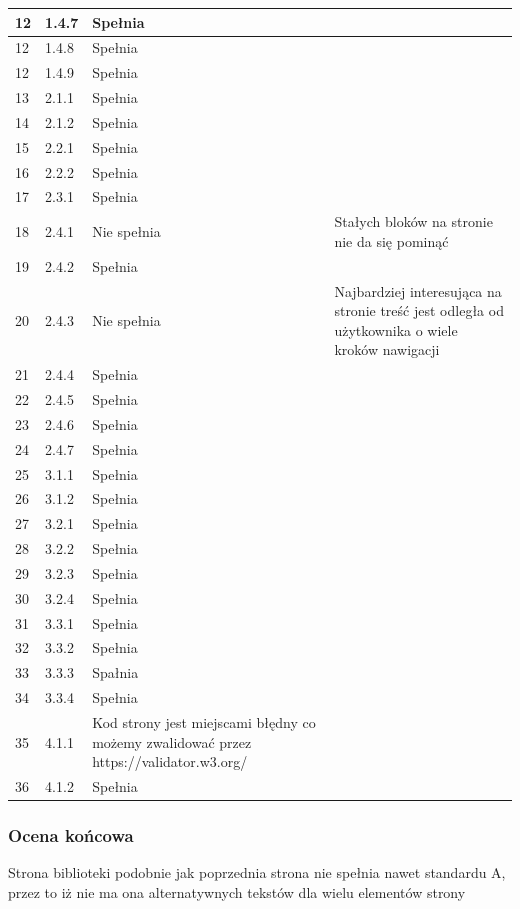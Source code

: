\documentclass[12pt]{article}
\begin{document}
\begin{longtable}{|p{}|p{}|p{}|p{}|}
        \hline
        12 & 1.4.7 &  Spełnia & \\
        \hline
        12 & 1.4.8 &  Spełnia & \\
        \hline
        12 & 1.4.9 &  Spełnia & \\
        \hline
        13 & 2.1.1 &  Spełnia & \\
        \hline
        14 & 2.1.2 & Spełnia & \\
        \hline
        15 & 2.2.1 &  Spełnia & \\
        \hline
        16 & 2.2.2 &  Spełnia & \\
        \hline
        17 & 2.3.1 &  Spełnia & \\
        \hline
        18 & 2.4.1 & Nie spełnia & Stałych bloków na stronie nie da się pominąć\\
        \hline
        19 & 2.4.2 &  Spełnia & \\
        \hline
        20 & 2.4.3 &  Nie spełnia & Najbardziej interesująca na stronie treść jest odległa od użytkownika o wiele kroków nawigacji\\
        \hline
        21 & 2.4.4 &  Spełnia & \\
        \hline
        22 & 2.4.5 &  Spełnia & \\
        \hline
        23 & 2.4.6 &  Spełnia & \\
        \hline
        24 & 2.4.7 &  Spełnia & \\
        \hline
        25 & 3.1.1 &  Spełnia & \\
        \hline
        26 & 3.1.2 &  Spełnia & \\
        \hline
        27 & 3.2.1 &  Spełnia & \\
        \hline
        28 & 3.2.2 &  Spełnia & \\
        \hline
        29 & 3.2.3 &  Spełnia & \\
        \hline
        30 & 3.2.4 &  Spełnia & \\
        \hline
        31 & 3.3.1 &  Spełnia & \\
        \hline
        32 & 3.3.2 &  Spełnia & \\
        \hline
        33 & 3.3.3 &  Spałnia & \\
        \hline
        34 & 3.3.4 &  Spełnia & \\
        \hline
        35 & 4.1.1 &  Kod strony jest miejscami błędny co możemy zwalidować przez https://validator.w3.org/ & \\
        \hline
        36 & 4.1.2 & Spełnia & \\
        \hline
    \end{longtable}

    \subsubsection{Ocena końcowa}

    Strona biblioteki podobnie jak poprzednia strona nie spełnia nawet standardu A, przez to iż nie ma ona alternatywnych tekstów dla wielu elementów strony
\end{document}

